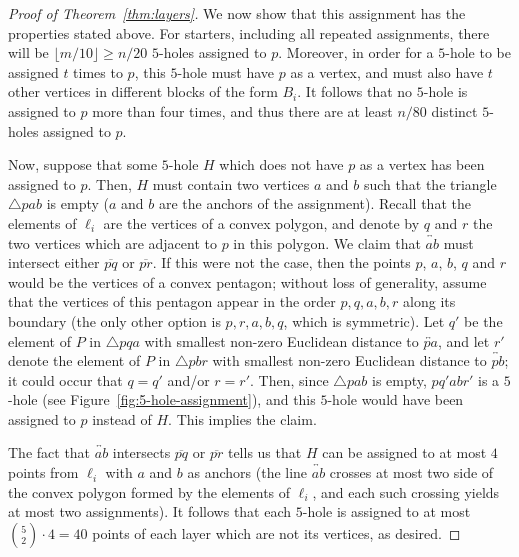 \documentclass[12pt,reqno, a4paper]{amsart}
\begin{document}
\begin{proof}[Proof of Theorem~\ref{thm:layers}]
    We now show that this assignment has the properties stated above. For starters, including all repeated assignments, there will be $\lfloor m/10\rfloor\geq n/20$ $5$-holes assigned to $p$. Moreover, in order for a $5$-hole to be assigned $t$ times to $p$, this $5$-hole must have $p$ as a vertex, and must also have $t$ other vertices in different blocks of the form $B_i$. It follows that no $5$-hole is assigned to $p$ more than four times, and thus there are at least $n/80$ distinct $5$-holes assigned to $p$. 
    
    Now, suppose that some $5$-hole $H$ which does not have $p$ as a vertex has been assigned to $p$. Then, $H$ must contain two vertices $a$ and $b$ such that the triangle $\triangle pab$ is empty ($a$ and $b$ are the anchors of the assignment). Recall that the elements of $\ell_i$ are the vertices of a convex polygon, and denote by $q$ and $r$ the two vertices which are adjacent to $p$ in this polygon. We claim that $\overleftrightarrow{ab}$ must intersect either $\overline{pq}$ or $\overline{pr}$. If this were not the case, then the points $p$, $a$, $b$, $q$ and $r$ would be the vertices of a convex pentagon; without loss of generality, assume that the vertices of this pentagon appear in the order $p,q,a,b,r$ along its boundary (the only other option is $p,r,a,b,q$, which is symmetric). Let $q'$ be the element of $P$ in $\triangle pqa$ with smallest non-zero Euclidean distance to $\overleftrightarrow{pa}$, and let $r'$ denote the element of $P$ in $\triangle pbr$ with smallest non-zero Euclidean distance to $\overleftrightarrow{pb}$; it could occur that $q=q'$ and/or $r=r'$. Then, since $\triangle pab$ is empty, $pq'abr'$ is a $5$-hole (see Figure~\ref{fig:5-hole-assignment}), and this $5$-hole would have been assigned to $p$ instead of $H$. This implies the claim. 
    
    The fact that $\overleftrightarrow{ab}$ intersects $\overline{pq}$ or $\overline{pr}$ tells us that $H$ can be assigned to at most 
    $4$ points from $\ell_i$ with $a$ and $b$ as anchors (the line $\overleftrightarrow{ab}$ crosses at most two side of the convex polygon formed by the elements of $\ell_i$, and each such crossing yields at most two assignments). It follows that each $5$-hole is assigned to at most $\binom{5}{2}\cdot 4=40$ points of each layer which are not its vertices, as desired.
\end{proof}
\end{document}
